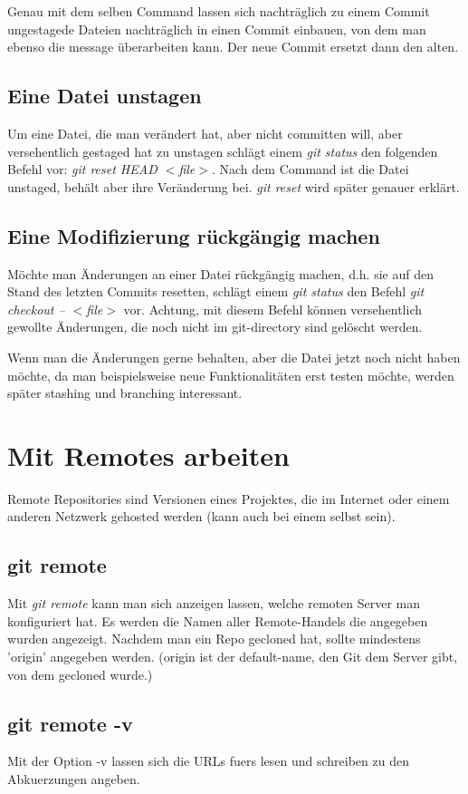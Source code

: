 \documentclass{article}
\begin{document}
Genau mit dem selben Command lassen sich nachträglich zu einem Commit ungestagede Dateien nachträglich in einen Commit einbauen, von dem man ebenso die message überarbeiten kann. Der neue Commit ersetzt dann den alten.

\subsection*{Eine Datei unstagen}
Um eine Datei, die man verändert hat, aber nicht committen will, aber versehentlich gestaged hat zu unstagen schlägt einem \textit{git status} den folgenden Befehl vor:
\textit{git reset HEAD $<$file$>$}. Nach dem Command ist die Datei unstaged, behält aber ihre Veränderung bei. \textit{git reset} wird später genauer erklärt.

\subsection*{Eine Modifizierung rückgängig machen}
Möchte man Änderungen an einer Datei rückgängig machen, d.h. sie auf den Stand des letzten Commits resetten, schlägt einem \textit{git status} den Befehl \textit{git checkout -- $<$file$>$} vor. Achtung, mit diesem Befehl können versehentlich gewollte Änderungen, die noch nicht im git-directory sind gelöscht werden.

Wenn man die Änderungen gerne behalten, aber die Datei jetzt noch nicht haben möchte, da man beispielsweise neue Funktionalitäten erst testen möchte, werden später stashing und branching interessant.

\section*{Mit Remotes arbeiten}
Remote Repositories sind Versionen eines Projektes, die im Internet oder einem anderen Netzwerk gehosted werden (kann auch bei einem selbst sein).

\subsection*{git remote}
Mit \textit{git remote} kann man sich anzeigen lassen, welche remoten Server man konfiguriert hat. Es werden die Namen aller Remote-Handels die angegeben wurden angezeigt. Nachdem man ein Repo gecloned hat, sollte mindestens 'origin' angegeben werden. (origin ist der default-name, den Git dem Server gibt, von dem gecloned wurde.)

\subsection*{git remote -v}
Mit der Option -v lassen sich die URLs fuers lesen und schreiben zu den Abkuerzungen angeben.
\end{document}
